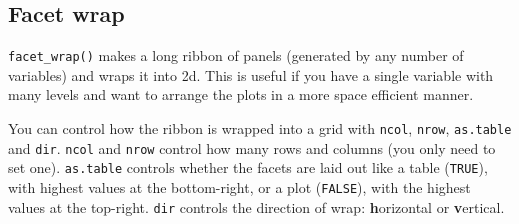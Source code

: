 \begin{Shaded}
\end{Shaded}

\subsection{Facet wrap}\label{sub:facet-wrap}

\texttt{facet\_wrap()} makes a long ribbon of panels (generated by any
number of variables) and wraps it into 2d. This is useful if you have a
single variable with many levels and want to arrange the plots in a more
space efficient manner.  
\indexc{\textasciitilde}

You can control how the ribbon is wrapped into a grid with
\texttt{ncol}, \texttt{nrow}, \texttt{as.table} and \texttt{dir}.
\texttt{ncol} and \texttt{nrow} control how many rows and columns (you
only need to set one). \texttt{as.table} controls whether the facets are
laid out like a table (\texttt{TRUE}), with highest values at the
bottom-right, or a plot (\texttt{FALSE}), with the highest values at the
top-right. \texttt{dir} controls the direction of wrap:
\textbf{h}orizontal or \textbf{v}ertical.

\begin{Shaded}
\begin{Highlighting}[]
\StringTok{ }\StringTok{ }
\StringTok{  }\NormalTok{() +}\StringTok{ }
\StringTok{  }\NormalTok{(}\NormalTok{) +}\StringTok{ }
\StringTok{  }\NormalTok{(}\NormalTok{)}

\StringTok{ } \NormalTok{)}
\StringTok{ } \NormalTok{, } \NormalTok{)}
\end{Highlighting}
\end{Shaded}

